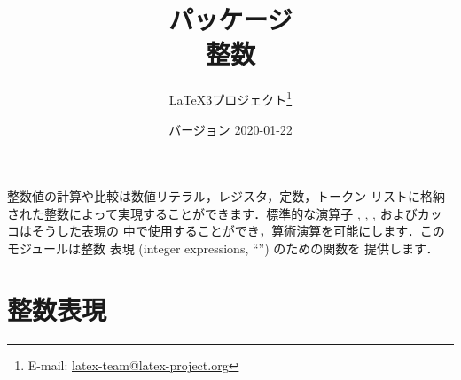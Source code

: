 \documentclass[uplatex,dvipdfmx,full,kernel]{wtpl3doc}
\begin{document}
\title{パッケージ\\ 整数}
\author{%
 \LaTeX3プロジェクト\thanks
   {%
     E-mail:
       \href{mailto:latex-team@latex-project.org}
         {latex-team@latex-project.org}%
   }%
}
\date{バージョン 2020-01-22}

\maketitle

\begin{documentation}

整数値の計算や比較は数値リテラル，レジスタ，定数，トークン
リストに格納された整数によって実現することができます．標準的な演算子
\code{+}, \code{-}, \code{/}, \code{*}およびカッコはそうした表現の
中で使用することができ，算術演算を可能にします．このモジュールは整数
表現 (integer expressions, \enquote{}) のための関数を
提供します．

\section{整数表現}


\end{documentation}
\end{document}
